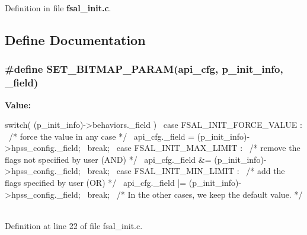 Definition in file {\bf fsal\_\-init.c}.

\subsection{Define Documentation}
\subsubsection[{SET\_\-BITMAP\_\-PARAM}]{\setlength{\rightskip}{0pt plus 5cm}\#define SET\_\-BITMAP\_\-PARAM(api\_\-cfg, \/  p\_\-init\_\-info, \/  \_\-field)}\label{fsal__init_8c_ad4acf7e55a5ad7300edb9d27c5865001}
{\bfseries Value:}
\begin{DoxyCode}
switch( (p_init_info)->behaviors._field ){                \
      case FSAL_INIT_FORCE_VALUE :                            \
        /* force the value in any case */                     \
        api_cfg._field = (p_init_info)->hpss_config._field;   \
        break;                                                \
      case FSAL_INIT_MAX_LIMIT :                              \
        /* remove the flags not specified by user (AND) */    \
        api_cfg._field &= (p_init_info)->hpss_config._field;  \
        break;                                                \
      case FSAL_INIT_MIN_LIMIT :                              \
        /* add the flags specified by user (OR) */            \
        api_cfg._field |= (p_init_info)->hpss_config._field;  \
        break;                                                \
    /* In the other cases, we keep the default value. */      \
    }                                                         \
\end{DoxyCode}


Definition at line 22 of file fsal\_\-init.c.
